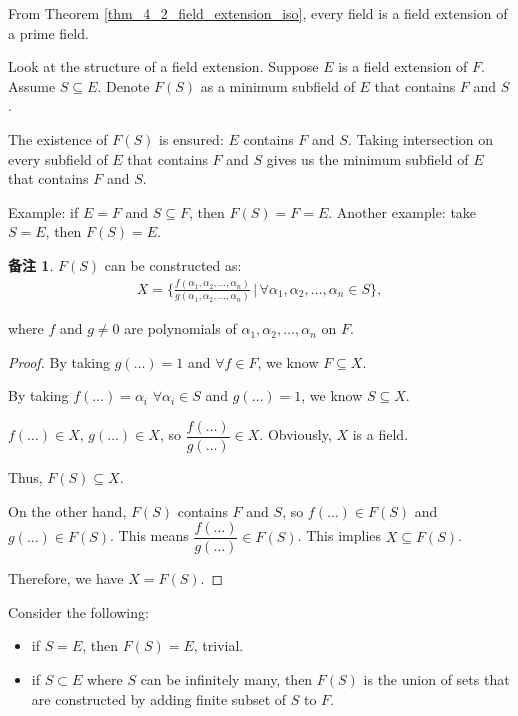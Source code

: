 \documentclass[utf8]{ctexbook}
\theoremstyle{definition}
\newtheorem{memo}{备注}[section]
\begin{document}
From Theorem \ref{thm_4_2_field_extension_iso}, every field is a field extension of a prime field.

Look at the structure of a field extension. Suppose $E$ is a field extension of $F$. Assume $S \subseteq E$. Denote $F(S)$ as a minimum subfield of $E$ that contains $F$ and $S$.

The existence of $F(S)$ is ensured: $E$ contains $F$ and $S$. Taking intersection on every subfield of $E$ that contains $F$ and $S$ gives us the minimum subfield of $E$ that contains $F$ and $S$. 

Example: if $E=F$ and $S \subseteq F$, then $F(S)=F=E$. Another example: take $S=E$, then $F(S)=E$.

\begin{memo}\label{memo_constructive_field_extension}
$F(S)$ can be constructed as:
\begin{align*}
X = \big\{ \frac{f(\alpha_1, \alpha_2, \ldots, \alpha_n)}{g(\alpha_1, \alpha_2, \ldots, \alpha_n)} \, | \, \forall \alpha_1, \alpha_2, \ldots, \alpha_n \in S \big\},
\end{align*}

where $f$ and $g \neq 0$ are polynomials of $\alpha_1, \alpha_2, \ldots, \alpha_n$ on $F$. 

\begin{proof}
By taking $g(\ldots)=1$ and $\forall f \in F$, we know $F \subseteq X$.

By taking $f(\ldots) = \alpha_i$ $\forall \alpha_i \in S$ and $g(\ldots)=1$, we know $S \subseteq X$.

$f(\ldots) \in X$, $g(\ldots) \in X$, so $\dfrac{f(\ldots)}{g(\ldots)} \in X$. Obviously, $X $ is a field. 

Thus, $F(S) \subseteq X$.

On the other hand, $F(S)$ contains $F$ and $S$, so $f(\ldots) \in F(S)$ and $g(\ldots) \in F(S)$. This means $\dfrac{f(\ldots)}{g(\ldots)} \in F(S)$. This implies $X \subseteq F(S)$.

Therefore, we have $X = F(S)$.

\end{proof}

\end{memo}

Consider the following:
\begin{itemize}
\item{if $S =E$, then $F(S)=E$, trivial.}
\item{if $S \subset E$ where $S$ can be infinitely many, then $F(S)$ is the union of sets that are constructed by adding finite subset of $S$ to $F$.}
\end{itemize}
\end{document}
